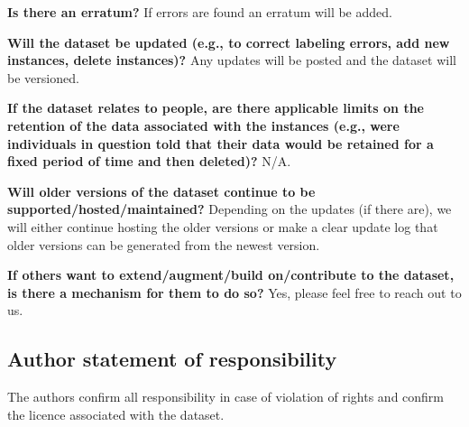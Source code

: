 \documentclass[lettersize,journal]{IEEEtran}
\begin{document}
\textbf{Is there an erratum?} If errors are found an erratum will be added.

\textbf{Will the dataset be updated (e.g., to correct labeling errors, add new instances, delete instances)?} Any updates will be posted and the dataset will be versioned.

\textbf{If the dataset relates to people, are there applicable limits on the retention of the data associated with the instances (e.g., were individuals in question told that their data would be retained for a fixed period of time and then deleted)?} N/A.

\textbf{Will older versions of the dataset continue to be supported/hosted/maintained?} Depending on the updates (if there are), we will either continue hosting the older versions or make a clear update log that older versions can be generated from the newest version.

\textbf{If others want to extend/augment/build on/contribute to the dataset, is there a mechanism for
them to do so?} Yes, please feel free to reach out to us.

\subsection{Author statement of responsibility}

The authors confirm all responsibility in case of violation of rights and confirm the licence associated with the dataset.



\clearpage
{
\printbibliography[segment=1]
}
\end{document}
